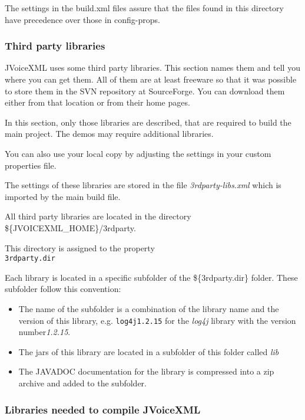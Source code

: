 \documentclass[11pt,a4paper]{article}
\begin{document}
The settings in the build.xml files assure that the files
found in this directory have precedence over those in config-props.

\subsubsection{Third party libraries}
\label{sec:third-party-libr}

JVoiceXML uses some third party libraries. This section names them and tell
you where you can get them. All of them are at least freeware
so that it was possible to store them in the SVN repository at
SourceForge. You can download them either from that location or
from their home pages. 

In this section, only those libraries are described, that are required
to build the main project. The demos may require additional libraries.

You can also use your local copy by adjusting the settings in your
custom properties file.

The settings of these libraries are stored in the file \emph{3rdparty-libs.xml}
which is imported by the main build file.

All third party libraries are located in the directory \\
\$\{JVOICEXML\_HOME\}/3rdparty.

This directory is assigned to the property \\
\texttt{3rdparty.dir}

Each library is located in a specific subfolder of the \$\{3rdparty.dir\}
folder. These subfolder follow this convention:

\begin{itemize}
\item The name of the subfolder is a combination of the library name and
the version of this library, e.g. \texttt{log4j1.2.15} for the \emph{log4j}
library with the version number\emph{1.2.15}.
\item The jars of this library are located in a subfolder of this folder
called \emph{lib}
\item The JAVADOC documentation for the library is compressed into a zip
archive and added to the subfolder.
\end{itemize}

\subsubsection{Libraries needed to compile JVoiceXML}
\label{sec:libr-need-comp}
\end{document}
